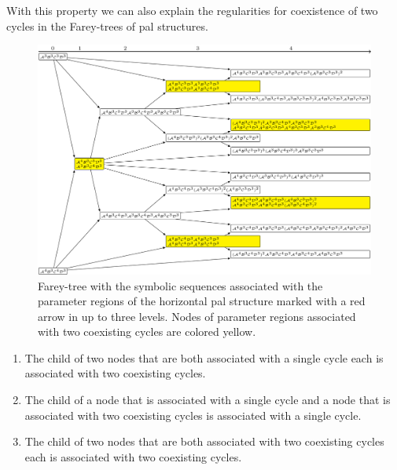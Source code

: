 With this property we can also explain the regularities for coexistence of two cycles in the Farey-trees of \gls{pal} structures.

\begin{figure}
	\centering
	\includegraphics[width=.7 \textwidth]{../Figures/7/7.21/adding.png}
	\caption[Farey-tree with the symbolic sequences of a horizontal  structure]{
		Farey-tree with the symbolic sequences associated with the parameter regions of the horizontal \gls{pal} structure marked with a red arrow in  up to three levels.
		Nodes of parameter regions associated with two coexisting cycles are colored yellow.
	}
	\label{fig:add.prop.hor.tree}
\end{figure}

\begin{theorem}
	\label{theorem:child.coexistence}
	\begin{enumerate}
		\item The child of two nodes that are both associated with a single cycle each is associated with two coexisting cycles.
		\item The child of a node that is associated with a single cycle and a node that is associated with two coexisting cycles is associated with a single cycle.
		\item The child of two nodes that are both associated with two coexisting cycles each is associated with two coexisting cycles.
	\end{enumerate}
\end{theorem}


